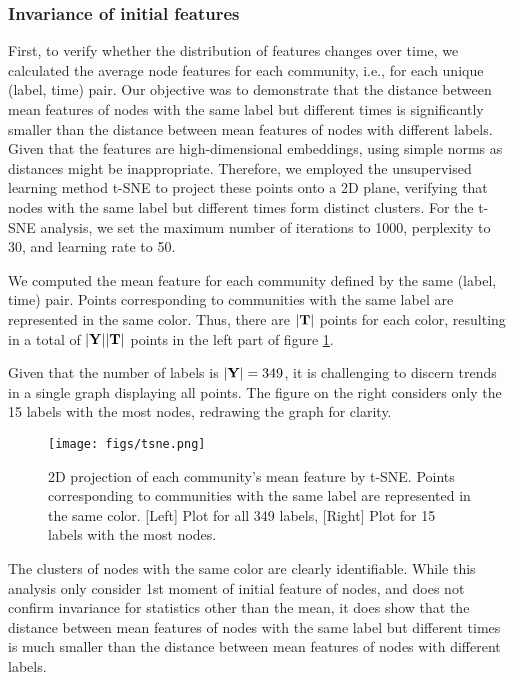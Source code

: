 \subsubsection{Invariance of initial features}
First, to verify whether the distribution of features changes over time, we calculated the average node features for each community, i.e., for each unique (label, time) pair. Our objective was to demonstrate that the distance between mean features of nodes with the same label but different times is significantly smaller than the distance between mean features of nodes with different labels. Given that the features are high-dimensional embeddings, using simple norms as distances might be inappropriate. Therefore, we employed the unsupervised learning method t-SNE \cite{van2008visualizing} to project these points onto a 2D plane, verifying that nodes with the same label but different times form distinct clusters. 
For the t-SNE analysis, we set the maximum number of iterations to 1000, perplexity to 30, and learning rate to 50.

We computed the mean feature for each community defined by the same (label, time) pair. Points corresponding to communities with the same label are represented in the same color. Thus, there are $|\bold{T}|$ points for each color, resulting in a total of $|\bold{Y}||\bold{T}|$ points in the left part of figure \ref{fig:tsne}.

Given that the number of labels is $|\bold{Y}|=349$, it is challenging to discern trends in a single graph displaying all points. The figure on the right considers only the 15 labels with the most nodes, redrawing the graph for clarity.

\begin{figure}[hbt!]
	\centering
	\texttt{[image: figs/tsne.png]}
	\vspace{-0.1in}
	\caption{2D projection of each community's mean feature by t-SNE. Points corresponding to communities with the same label are represented in the same color. [Left] Plot for all 349 labels, [Right] Plot for 15 labels with the most nodes.}
	 \label{fig:tsne}
\end{figure}

The clusters of nodes with the same color are clearly identifiable. While this analysis only consider 1st moment of initial feature of nodes, and does not confirm invariance for statistics other than the mean, it does show that the distance between mean features of nodes with the same label but different times is much smaller than the distance between mean features of nodes with different labels.



